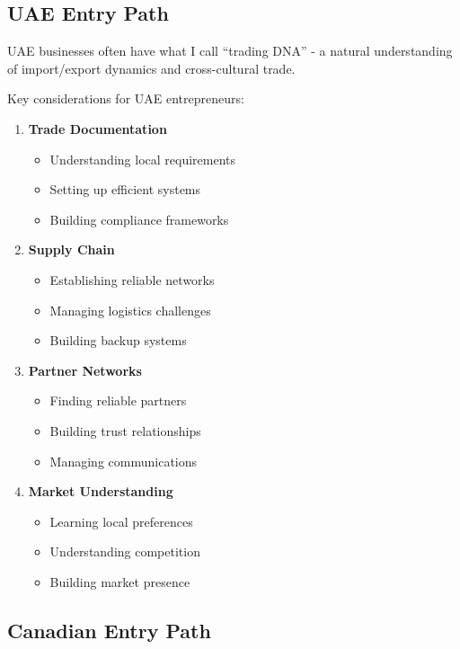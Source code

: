\subsection{UAE Entry Path}\label{subsec:uae-entry-path}

UAE businesses often have what I call ``trading DNA'' - a natural understanding of import/export dynamics and cross-cultural trade.

Key considerations for UAE entrepreneurs:

\begin{enumerate}
    \item \textbf{Trade Documentation}
    \begin{itemize}
        \item Understanding local requirements
        \item Setting up efficient systems
        \item Building compliance frameworks
    \end{itemize}

    \item \textbf{Supply Chain}
    \begin{itemize}
        \item Establishing reliable networks
        \item Managing logistics challenges
        \item Building backup systems
    \end{itemize}

    \item \textbf{Partner Networks}
    \begin{itemize}
        \item Finding reliable partners
        \item Building trust relationships
        \item Managing communications
    \end{itemize}

    \item \textbf{Market Understanding}
    \begin{itemize}
        \item Learning local preferences
        \item Understanding competition
        \item Building market presence
    \end{itemize}
\end{enumerate}

\subsection{Canadian Entry Path}\label{subsec:canadian-entry-path}

